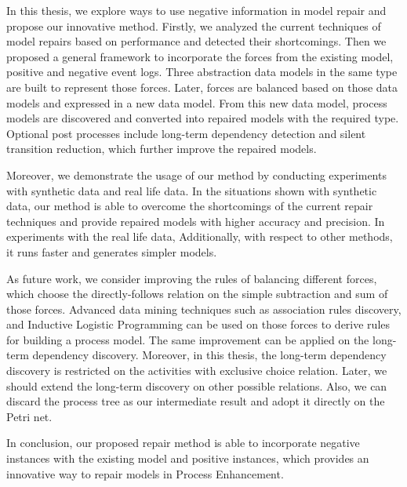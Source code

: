 
In this thesis, we explore ways to use negative information in model repair and propose our innovative method. Firstly, we analyzed the current techniques of model repairs based on performance and detected their shortcomings. Then we  proposed a general framework to incorporate the forces from the existing model, positive and negative event logs. Three abstraction data models in the same type are built to represent those forces. Later, forces are balanced based on those data models and expressed in a new data model. From this new data model, process models are discovered and converted into repaired models with the required type. Optional post processes include long-term dependency detection and silent transition reduction, which further improve the repaired models. 

Moreover, we demonstrate the usage of our method by conducting experiments with synthetic data and real life data. In the situations shown with synthetic data,  our method is able to overcome the shortcomings of the current repair techniques and provide repaired models with higher accuracy and precision. In experiments with the real life data, 
Additionally, with respect to other methods, it runs faster and generates simpler models. 

As future work, we consider improving the rules of balancing different forces, which choose the directly-follows relation on the simple subtraction and sum of those forces. Advanced data mining techniques such as association rules discovery, and Inductive Logistic Programming can be used on those forces to derive rules for building a process model. The same improvement can be applied on the long-term dependency discovery. Moreover, in this thesis, the long-term dependency discovery is restricted on the activities with exclusive choice relation. Later, we should extend the long-term discovery on other possible relations. Also, we can discard the process tree as our intermediate result and adopt it directly on the Petri net. 

In conclusion, our proposed repair method is able to incorporate negative instances with the existing model and positive instances, which provides an innovative way to repair models in Process Enhancement. 
